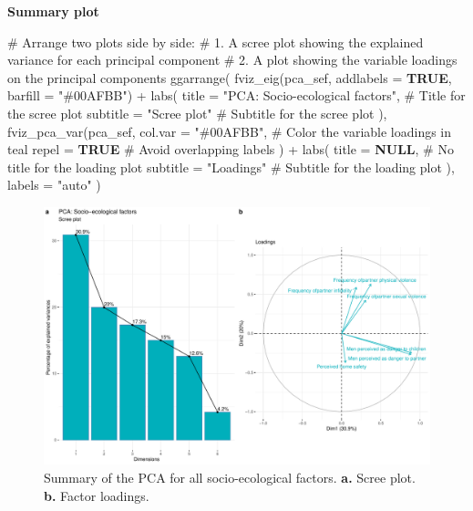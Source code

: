 \documentclass[
  bookmarksnumbered]{article}
\newenvironment{Shaded}{\begin{snugshade}}{\end{snugshade}}
\newcommand{\AttributeTok}[1]{\textcolor[rgb]{0.80,0.80,0.80}{#1}}
\newcommand{\CommentTok}[1]{\textcolor[rgb]{0.50,0.62,0.50}{#1}}
\newcommand{\ConstantTok}[1]{\textcolor[rgb]{0.86,0.64,0.64}{\textbf{#1}}}
\newcommand{\FunctionTok}[1]{\textcolor[rgb]{0.94,0.94,0.56}{#1}}
\newcommand{\NormalTok}[1]{\textcolor[rgb]{0.80,0.80,0.80}{#1}}
\newcommand{\SpecialCharTok}[1]{\textcolor[rgb]{0.86,0.64,0.64}{#1}}
\newcommand{\StringTok}[1]{\textcolor[rgb]{0.80,0.58,0.58}{#1}}
\begin{document}
\textbf{Summary plot}

\begin{Shaded}
\begin{Highlighting}[]
\CommentTok{\# Arrange two plots side by side:}
\CommentTok{\# 1. A scree plot showing the explained variance for each principal component}
\CommentTok{\# 2. A plot showing the variable loadings on the principal components}
\FunctionTok{ggarrange}\NormalTok{(}
  \FunctionTok{fviz\_eig}\NormalTok{(pca\_sef, }\AttributeTok{addlabels =} \ConstantTok{TRUE}\NormalTok{, }\AttributeTok{barfill =} \StringTok{"\#00AFBB"}\NormalTok{) }\SpecialCharTok{+}
    \FunctionTok{labs}\NormalTok{(}
      \AttributeTok{title =} \StringTok{"PCA: Socio{-}ecological factors"}\NormalTok{, }\CommentTok{\# Title for the scree plot}
      \AttributeTok{subtitle =} \StringTok{"Scree plot"} \CommentTok{\# Subtitle for the scree plot}
\NormalTok{    ),}
  \FunctionTok{fviz\_pca\_var}\NormalTok{(pca\_sef,}
    \AttributeTok{col.var =} \StringTok{"\#00AFBB"}\NormalTok{, }\CommentTok{\# Color the variable loadings in teal}
    \AttributeTok{repel =} \ConstantTok{TRUE} \CommentTok{\# Avoid overlapping labels}
\NormalTok{  ) }\SpecialCharTok{+}
    \FunctionTok{labs}\NormalTok{(}
      \AttributeTok{title =} \ConstantTok{NULL}\NormalTok{, }\CommentTok{\# No title for the loading plot}
      \AttributeTok{subtitle =} \StringTok{"Loadings"} \CommentTok{\# Subtitle for the loading plot}
\NormalTok{    ),}
  \AttributeTok{labels =} \StringTok{"auto"}
\NormalTok{)}
\end{Highlighting}
\end{Shaded}

\begin{figure}
\centering
\includegraphics{Supplementary_material_files/figure-latex/pca-sef-plot-1.pdf}
\caption{\label{fig:pca-sef-plot}Summary of the PCA for all socio-ecological factors. \textbf{a.} Scree plot. \textbf{b.} Factor loadings.}
\end{figure}
\end{document}
